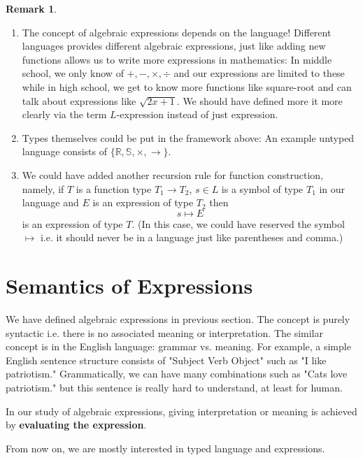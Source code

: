 \documentclass{amsart}
\theoremstyle{definition}
\newtheorem*{remark}{Remark}
\newcommand{\term}[1]{\textbf{#1}}
\newcommand{\R}{\mathbb{R}}
\renewcommand{\S}{\mathbb{S}}
\begin{document}
\begin{remark}
\begin{enumerate}
\item The concept of algebraic expressions depends on the language! Different languages provides different algebraic expressions, just like adding new functions allows us to write more expressions in mathematics: In middle school, we only know of $+, -, \times, \div$ and our expressions are limited to these while in high school, we get to know more functions like square-root and can talk about expressions like $\sqrt{2x + 1}$. We should have defined more it more clearly via the term $L$-expression instead of just expression.

\item Types themselves could be put in the framework above: An example untyped language consists of $\{\R, \S, \times, \rightarrow\}$.

\item We could have added another recursion rule for function construction, namely, if $T$ is a function type $T_1 \rightarrow T_2$, $s \in L$ is a symbol of type $T_1$ in our language and $E$ is an expression of type $T_2$ then
$$s \mapsto E$$
is an expression of type $T$. (In this case, we could have reserved the symbol $\mapsto$ i.e. it should never be in a language just like parentheses and comma.)
\end{enumerate}
\end{remark}

\section{Semantics of Expressions}

We have defined algebraic expressions in previous section. The concept is purely syntactic i.e. there is no associated meaning or interpretation. The similar concept is in the English language: grammar vs. meaning. For example, a simple English sentence structure consists of "Subject Verb Object" such as "I like patriotism." Grammatically, we can have many combinations such as "Cats love patriotism." but this sentence is really hard to understand, at least for human.

In our study of algebraic expressions, giving interpretation or meaning is achieved by \term{evaluating the expression}.

From now on, we are mostly interested in typed language and expressions.

\newcommand{\B}{\mathcal{B}}
\end{document}
